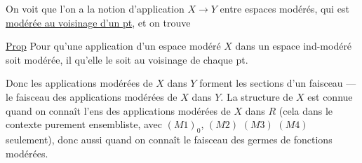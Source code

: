 On voit  que l'on a la notion d'application $X\longrightarrow Y$ entre espaces modérés, qui est \uline{modérée au voisinage d'un pt}, et on trouve

\uline{Prop} Pour qu'une application d'un espace modéré $X$ dans un espace ind-modéré soit modérée, il  qu'elle le soit au voisinage de chaque pt.

Donc les applications modérées de $X$ dans $Y$ forment les sections d'un faisceau --- le faisceau des applications modérées de $X$ dans $Y$. La structure  de $X$ est connue quand on connaît l'ens des applications modérées de $X$ dans $R$ (cela  dans le contexte purement ensembliste, avec $(M1)_0$, $(M2)$ $(M3)$ $(M4)$ seulement), donc aussi quand on connaît le faisceau des germes de fonctions modérées.
